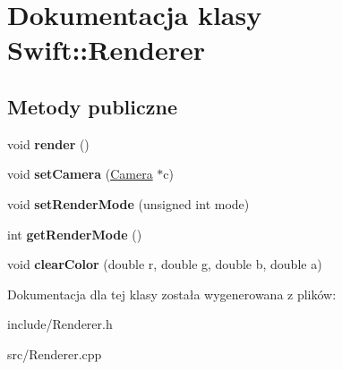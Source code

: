 \hypertarget{class_swift_1_1_renderer}{\section{Dokumentacja klasy Swift\-:\-:Renderer}
\label{class_swift_1_1_renderer}
}
\subsection*{Metody publiczne}
\begin{DoxyCompactItemize}
\item 
\hypertarget{class_swift_1_1_renderer_abdde0957ffcda6dff1f36473b3d4729f}{void {\bfseries render} ()}\label{class_swift_1_1_renderer_abdde0957ffcda6dff1f36473b3d4729f}

\item 
\hypertarget{class_swift_1_1_renderer_af44e3cdc0e9f3cefb5a576ab873806bc}{void {\bfseries set\-Camera} (\hyperlink{class_swift_1_1_camera}{Camera} $\ast$c)}\label{class_swift_1_1_renderer_af44e3cdc0e9f3cefb5a576ab873806bc}

\item 
\hypertarget{class_swift_1_1_renderer_a87e97312cc9816407510a19ea6449a6c}{void {\bfseries set\-Render\-Mode} (unsigned int mode)}\label{class_swift_1_1_renderer_a87e97312cc9816407510a19ea6449a6c}

\item 
\hypertarget{class_swift_1_1_renderer_a16000bca04395354b6450a9a920e4884}{int {\bfseries get\-Render\-Mode} ()}\label{class_swift_1_1_renderer_a16000bca04395354b6450a9a920e4884}

\item 
\hypertarget{class_swift_1_1_renderer_ae3c63586d9ef1546deb8eedac24710ec}{void {\bfseries clear\-Color} (double r, double g, double b, double a)}\label{class_swift_1_1_renderer_ae3c63586d9ef1546deb8eedac24710ec}

\end{DoxyCompactItemize}


Dokumentacja dla tej klasy została wygenerowana z plików\-:\begin{DoxyCompactItemize}
\item 
include/Renderer.\-h\item 
src/Renderer.\-cpp\end{DoxyCompactItemize}
